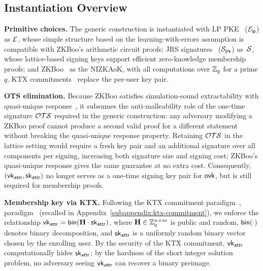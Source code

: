 \subsection{Instantiation Overview}
\label{subsection:overview-lattice-sms-description}

\noindent\textbf{Primitive choices.}
The generic construction is instantiated with
LP PKE~\cite{RSA:LinPei11} ($\mathcal{E}_{\mathsf{lp}}$) as $\mathcal{E}$,
whose simple structure based on the learning-with-errors assumption is compatible with ZKBoo's arithmetic circuit proofs;
JRS signatures~\cite{CRYPTO:JeuRouSan23} ($\mathcal{S}_{\mathsf{jrs}}$) as~$\mathcal{S}$,
whose lattice-based signing keys support efficient zero-knowledge membership proofs;
and ZKBoo~\cite{USENIX:GiaMadOrl16} as the NIZKAoK,
with all computations over $\mathbb{Z}_q$ for a prime $q$.
KTX commitments~\cite{AC:KawTanXag08} replace the per-user key pair.

\medskip
\noindent\textbf{OTS elimination.}
Because ZKBoo satisfies simulation-sound extractability with quasi-unique
response~\cite{INDOCRYPT:FKMV12},
it subsumes the anti-malleability role of the one-time signature $\mathcal{OTS}$
required in the generic construction:
any adversary modifying a ZKBoo proof cannot produce a second valid proof
for a different statement without breaking the quasi-unique response property.
Retaining $\mathcal{OTS}$ in the lattice setting would require a fresh key pair
and an additional signature over all components per signing,
increasing both signature size and signing cost;
ZKBoo's quasi-unique response gives the same guarantee at no extra cost.
Consequently, $(\mathsf{vk}_\mathsf{attr}, \mathsf{sk}_\mathsf{attr})$ no longer serves as a one-time signing key pair
for $\mathsf{ovk}$, but is still required for membership proofs.

\medskip
\noindent\textbf{Membership key via KTX.}
Following the KTX commitment 
\ifcameraready 
paradigm~\cite{AC:KawTanXag08},
\else 
paradigm~\cite{AC:KawTanXag08} (recalled in 
Appendix~\ref{subappendix:ktx-commitment}),
\fi
we enforce the relationship
$\mathsf{vk}_\mathsf{attr} = \mathsf{bin}(\mathbf{H} \cdot \mathsf{sk}_\mathsf{attr})$,
where $\mathbf{H} \in \mathbb{Z}_q^{n \times m}$ is public and random,
$\mathsf{bin}(\cdot)$ denotes binary decomposition,
and $\mathsf{sk}_\mathsf{attr}$ is a uniformly random binary vector chosen by the enrolling user.
By the security of the KTX commitment, $\mathsf{vk}_\mathsf{attr}$ computationally hides $\mathsf{sk}_\mathsf{attr}$;
by the hardness of the short integer solution problem, no adversary seeing $\mathsf{vk}_\mathsf{attr}$ can recover a binary preimage.

